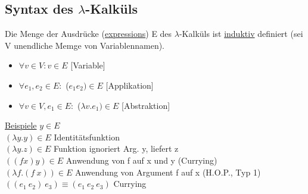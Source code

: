 \documentclass[a4paper,12pt]{article}
\begin{document}
\subsection{Syntax des $\lambda$-Kalküls}
Die Menge der Ausdrücke (\uline{expressions}) E des $\lambda$-Kalküls ist \uline{induktiv} definiert (sei V unendliche Memge von Variablennamen). 
\begin{itemize}
\item $\forall v \in V: v\in E$ [Variable]
\item $\forall e_1,e_2\in E:$ ($e_1 e_2)\in E$ [Applikation] %
\item $\forall v \in V, e_1\in E:$ ($\lambda v.e_1)\in E$ [Abstraktion] %
\end{itemize}
\uline{Beispiele}
$y\in E$\\
$(\lambda y.y) \in E$ Identitätsfunktion\\
$(\lambda y.z) \in E$ Funktion ignoriert Arg. y, liefert z\\
$((f x) y) \in E$ Anwendung von f auf x und y (Currying)\\
$(\lambda f.(f\ x))\in E$ Anwendung von Argument f auf x (H.O.P., Typ 1)\\

$((e_1 \ e_2)\ e_3) \equiv (e_1 \ e_2 \ e_3)$ Currying
\end{document}
